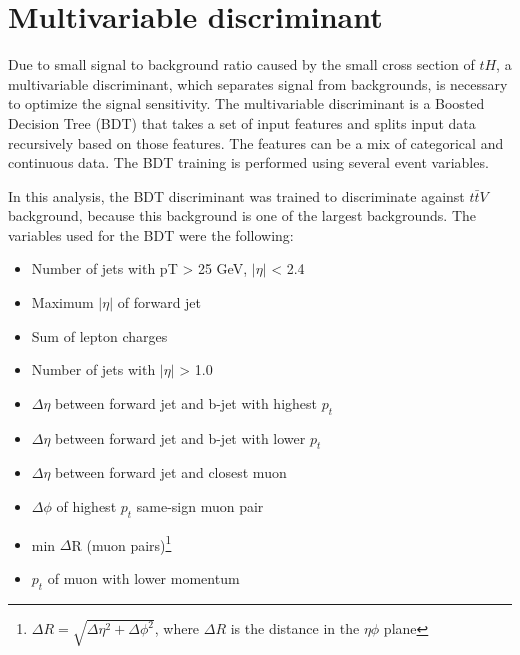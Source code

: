 

\pagebreak
\section{Multivariable discriminant}
Due to small signal to background ratio caused by the small cross section of $tH$, a multivariable discriminant, which separates signal from backgrounds, is necessary to optimize the signal sensitivity. The multivariable discriminant is a Boosted Decision Tree (BDT) that takes a set of input features and splits input data recursively based on those features. The features can be a mix of categorical and continuous data.
The BDT training is performed using several event variables.


In this analysis, the BDT discriminant was trained to discriminate against $t\bar{t}V$ background, because this background is one of the largest backgrounds. The variables used for the BDT were the following:

\begin{itemize}
\item Number of jets with pT > 25 GeV, $|\eta|$ < 2.4
\item Maximum $|\eta|$ of forward jet
\item Sum of lepton charges
\item Number of jets with $|\eta|$ > 1.0
\item $\Delta\eta$ between forward jet and b-jet with highest $p_t$
\item $\Delta\eta$ between forward jet and b-jet with lower $p_t$
\item $\Delta\eta$ between forward jet and closest muon
\item $\Delta\phi$ of highest $p_t$ same-sign muon pair
\item min $\Delta$R (muon pairs)\footnote{$\Delta R = \sqrt{ \Delta\eta^2 + \Delta\phi^2}$, where $\Delta R$ is the distance in the $\eta \phi$ plane}
\item $p_t$ of muon with lower momentum
\end{itemize}

